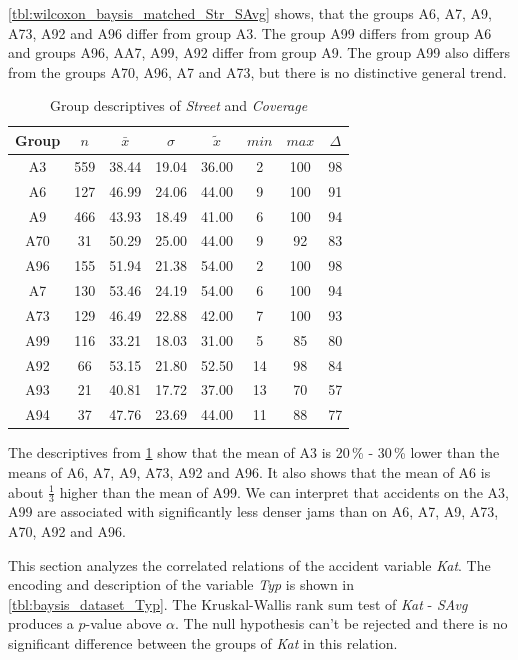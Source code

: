 \cref{tbl:wilcoxon_baysis_matched_Str_SAvg} shows, that the groups A6, A7, A9, A73, A92 and A96 differ from group A3. The group A99 differs from group A6 and groups A96, AA7, A99, A92 differ from group A9. The group A99 also differs from the groups A70, A96, A7 and A73, but there is no distinctive general trend. 
\begin{table}[ht!]
	\tiny
	\centering
	\begin{tabular}{c|c|c|c|c|c|c|c}
	  	\toprule
	 	Group & $n$ & $\bar{x}$ & $\sigma$ & $\tilde{x}$ & $min$ & $max$ & $\Delta$ \\   
	  	\midrule
		A3  & 559 & 38.44 & 19.04 & 36.00 & 2  & 100 & 98 \\ 
	  	A6  & 127 & 46.99 & 24.06 & 44.00 & 9  & 100 & 91 \\ 
	  	A9  & 466 & 43.93 & 18.49 & 41.00 & 6  & 100 & 94 \\ 
	  	A70 & 31  & 50.29 & 25.00 & 44.00 & 9  & 92  & 83 \\ 
	  	A96 & 155 & 51.94 & 21.38 & 54.00 & 2  & 100 & 98 \\ 
	  	A7  & 130 & 53.46 & 24.19 & 54.00 & 6  & 100 & 94 \\ 
	  	A73 & 129 & 46.49 & 22.88 & 42.00 & 7  & 100 & 93 \\ 
	  	A99 & 116 & 33.21 & 18.03 & 31.00 & 5  & 85  & 80 \\ 
	  	A92 & 66  & 53.15 & 21.80 & 52.50 & 14 & 98  & 84 \\ 
	  	A93 & 21  & 40.81 & 17.72 & 37.00 & 13 & 70  & 57 \\ 
	  	A94 & 37  & 47.76 & 23.69 & 44.00 & 11 & 88  & 77 \\ 	
	  	\bottomrule
	\end{tabular}
	\caption{Group descriptives of \textit{Street} and \textit{Coverage}}
	\label{tbl:descriptives_baysis_matched_Str_Cov}
\end{table}
The descriptives from \cref{tbl:descriptives_baysis_matched_Str_Cov} show that the mean of A3 is 20\,\% - 30\,\% lower than the means of A6, A7, A9, A73, A92 and A96. It also shows that the mean of A6 is about $\frac{1}{3}$ higher than the mean of A99. We can interpret that accidents on the A3, A99 are associated with significantly less denser jams than on A6, A7, A9, A73, A70, A92 and A96.

\label{ana:baysis_global_Kat}
This section analyzes the correlated relations of the accident variable \textit{Kat}. The encoding and description of the variable \textit{Typ} is shown in \cref{tbl:baysis_dataset_Typ}. The Kruskal-Wallis rank sum test of \textit{Kat} - \textit{SAvg} produces a $p$-value above $\alpha$. The null hypothesis can't be rejected and there is no significant difference between the groups of \textit{Kat} in this relation.

